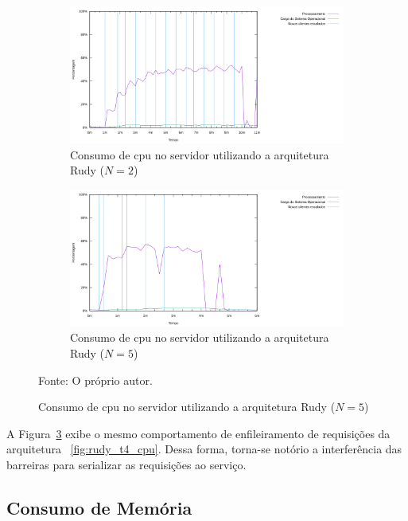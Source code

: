 \begin{figure}[htb!]
    \caption{Consumo de \ac{cpu} no servidor utilizando a arquitetura Rudy ($N=2$ e $N=5$)}
    \centering
    \begin{subfigure}{1.0\textwidth}
      \centering
      \includegraphics[width=.9\textwidth]{metricas_rudy_t5/cpu.png}
      \caption{Consumo de \ac{cpu} no servidor utilizando a arquitetura Rudy ($N=2$)}
      \label{fig:rudy_t5_cpu}
    \end{subfigure}


    \begin{subfigure}{1.0\textwidth}
      \centering
      \includegraphics[width=.9\textwidth]{metricas_rudy_t6/cpu.png}
      \caption{Consumo de \ac{cpu} no servidor utilizando a arquitetura Rudy ($N=5$)}
      \label{fig:rudy_t6_cpu}
    \end{subfigure}
    \label{fig:rudy_t56_cpu}

    Fonte: O próprio autor.
\end{figure}
A Figura~\ref{fig:rudy_t56_cpu} exibe o mesmo comportamento de enfileiramento de requisições da arquitetura ~\ref{fig:rudy_t4_cpu}.
%
Dessa forma, torna-se notório a interferência das barreiras para serializar as requisições ao serviço.
%


\subsection{Consumo de Memória}

